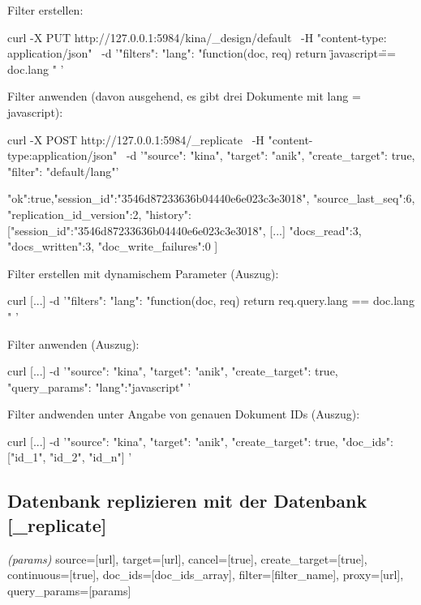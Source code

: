 \documentclass[19pt,landscape,twocolumn]{article}
\newcommand{\htmlverb}[1]{{[}\textbf{{#1}}{]}}
\newcommand{\brackets}[1]{{[}{#1}{]}}
\newcommand{\setparskip}{\setlength{\parskip}{-6mm}}
\newcommand{\resetparskip}{\setlength{\parskip}{1mm}}
\begin{document}
Filter erstellen:

\begin{code}
curl -X PUT http://127.0.0.1:5984/kina/_design/default \
  -H "content-type: application/json" \
  -d '{"filters":{
        "lang":
          "function(doc, req) {
            return \"javascript\" == doc.lang
          }"
        }
     }'
\end{code}

Filter anwenden (davon ausgehend, es gibt drei Dokumente mit lang = javascript):

\begin{code}
curl -X POST http://127.0.0.1:5984/_replicate \
     -H "content-type:application/json" \
     -d '{"source": "kina",
          "target": "anik",
          "create_target": true,
          "filter": "default/lang"}'
\end{code}
\setparskip
\begin{response}
{"ok":true,"session_id":"3546d87233636b04440e6e023c3e3018",
 "source_last_seq":6,
 "replication_id_version":2, "history":
  [{"session_id":"3546d87233636b04440e6e023c3e3018",
    [...]
    "docs_read":3,
    "docs_written":3,
    "doc_write_failures":0
  }]
}
\end{response}
\resetparskip

Filter erstellen mit dynamischem Parameter (Auszug):

\begin{code}
curl [...]
  -d '{"filters":{
       "lang":
         "function(doc, req) {
           return req.query.lang == doc.lang
         }"
       }
    }'
\end{code}

Filter anwenden (Auszug):

\begin{code}
curl [...]
  -d '{"source": "kina",
       "target": "anik",
       "create_target": true,
       "query_params": {
          "lang":"javascript"
       }
     }'
\end{code}

Filter andwenden unter Angabe von genauen Dokument IDs (Auszug):

\begin{code}
curl [...]
  -d '{"source": "kina",
       "target": "anik",
       "create_target": true,
       "doc_ids": ["id_1", "id_2", "id_n"]
     }'
\end{code}

\subsection{Datenbank replizieren mit der Datenbank \htmlverb{\_replicate}}
\emph{(params)} source=\brackets{url}, target=\brackets{url}, cancel=\brackets{true}, create\_target=\brackets{true},\newline
continuous=\brackets{true}, doc\_ids=\brackets{doc\_ids\_array}, filter=\brackets{filter\_name},\newline
proxy=\brackets{url}, query\_params=\brackets{params}\newline
\end{document}
